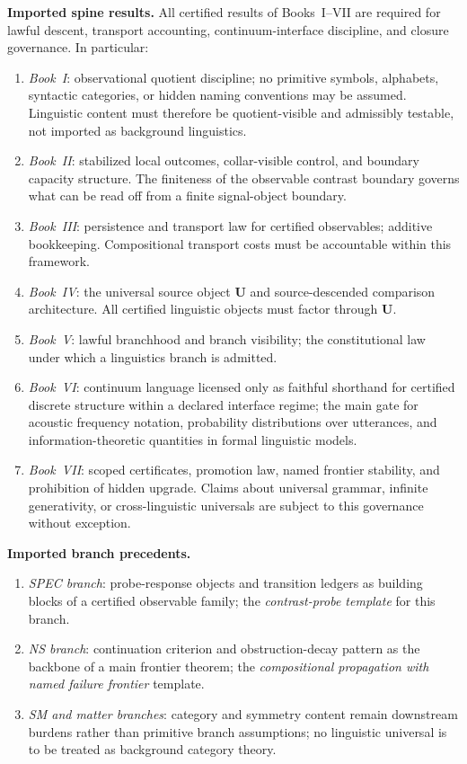 \documentclass[12pt,oneside]{amsbook}
\theoremstyle{plain}
\theoremstyle{definition}
\theoremstyle{remark}
\begin{document}
\textbf{Imported spine results.} All certified results of Books~I--VII
are required for lawful descent, transport accounting, continuum-interface
discipline, and closure governance. In particular:
\begin{enumerate}[label=\textup{(\arabic*)}]
 \item \emph{Book~I}: observational quotient discipline; no primitive
 symbols, alphabets, syntactic categories, or hidden naming conventions
 may be assumed. Linguistic content must therefore be
 quotient-visible and admissibly testable, not imported as background
 linguistics.
 \item \emph{Book~II}: stabilized local outcomes, collar-visible
 control, and boundary capacity structure. The finiteness of the
 observable contrast boundary governs what can be read off from a
 finite signal-object boundary.
 \item \emph{Book~III}: persistence and transport law for certified
 observables; additive bookkeeping. Compositional transport costs
 must be accountable within this framework.
 \item \emph{Book~IV}: the universal source object $\mathbf{U}$ and
 source-descended comparison architecture. All certified linguistic
 objects must factor through $\mathbf{U}$.
 \item \emph{Book~V}: lawful branchhood and branch visibility; the
 constitutional law under which a linguistics branch is admitted.
 \item \emph{Book~VI}: continuum language licensed only as faithful
 shorthand for certified discrete structure within a declared interface
 regime; the main gate for acoustic frequency notation, probability
 distributions over utterances, and information-theoretic quantities
 in formal linguistic models.
 \item \emph{Book~VII}: scoped certificates, promotion law, named
 frontier stability, and prohibition of hidden upgrade. Claims about
 universal grammar, infinite generativity, or cross-linguistic
 universals are subject to this governance without exception.
\end{enumerate}

\textbf{Imported branch precedents.}
\begin{enumerate}[label=\textup{(\arabic*)}]
 \item \emph{SPEC branch}: probe-response objects and transition
 ledgers as building blocks of a certified observable family; the
 \emph{contrast-probe template} for this branch.
 \item \emph{NS branch}: continuation criterion and obstruction-decay
 pattern as the backbone of a main frontier theorem; the
 \emph{compositional propagation with named failure frontier} template.
 \item \emph{SM and matter branches}: category and symmetry content
 remain downstream burdens rather than primitive branch assumptions;
 no linguistic universal is to be treated as background category
 theory.
\end{enumerate}
\end{document}
